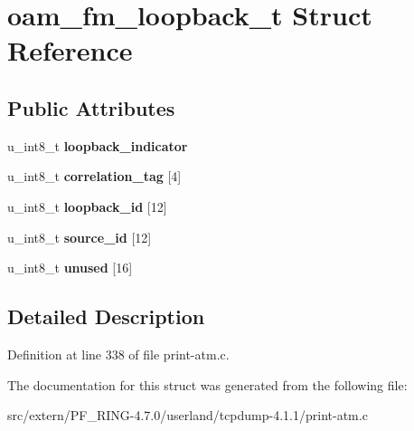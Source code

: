 \hypertarget{structoam__fm__loopback__t}{
\section{oam\_\-fm\_\-loopback\_\-t Struct Reference}
\label{structoam__fm__loopback__t}
}
\subsection*{Public Attributes}
\begin{DoxyCompactItemize}
\item 
\hypertarget{structoam__fm__loopback__t_a7839decdd83d2ad8ac3337ebfbd5da6b}{
u\_\-int8\_\-t {\bfseries loopback\_\-indicator}}
\label{structoam__fm__loopback__t_a7839decdd83d2ad8ac3337ebfbd5da6b}

\item 
\hypertarget{structoam__fm__loopback__t_af7428ccc3f475c610e1168fb5cbdac49}{
u\_\-int8\_\-t {\bfseries correlation\_\-tag} \mbox{[}4\mbox{]}}
\label{structoam__fm__loopback__t_af7428ccc3f475c610e1168fb5cbdac49}

\item 
\hypertarget{structoam__fm__loopback__t_aea839d2c0e2b4fb088359fef00092f66}{
u\_\-int8\_\-t {\bfseries loopback\_\-id} \mbox{[}12\mbox{]}}
\label{structoam__fm__loopback__t_aea839d2c0e2b4fb088359fef00092f66}

\item 
\hypertarget{structoam__fm__loopback__t_a0df21f21fae65a971200f2c0560bc2dd}{
u\_\-int8\_\-t {\bfseries source\_\-id} \mbox{[}12\mbox{]}}
\label{structoam__fm__loopback__t_a0df21f21fae65a971200f2c0560bc2dd}

\item 
\hypertarget{structoam__fm__loopback__t_a108b0b473d38a5425355ddba9a60aec3}{
u\_\-int8\_\-t {\bfseries unused} \mbox{[}16\mbox{]}}
\label{structoam__fm__loopback__t_a108b0b473d38a5425355ddba9a60aec3}

\end{DoxyCompactItemize}


\subsection{Detailed Description}


Definition at line 338 of file print-\/atm.c.



The documentation for this struct was generated from the following file:\begin{DoxyCompactItemize}
\item 
src/extern/PF\_\-RING-\/4.7.0/userland/tcpdump-\/4.1.1/print-\/atm.c\end{DoxyCompactItemize}
